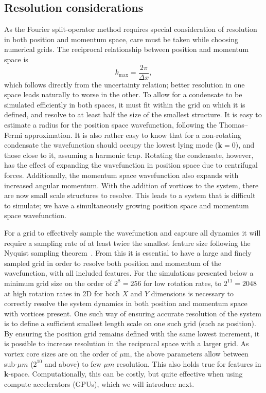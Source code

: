 \subsection{Resolution considerations}
As the Fourier split-operator method requires special consideration of resolution in both position and momentum space, care must be taken while choosing numerical grids. The reciprocal relationship between position and momentum space is \begin{equation}
    k_{\text{max}} = \frac{2\pi}{\Delta x},
\end{equation}
which follows directly from the uncertainty relation; better resolution in one space leads naturally to worse in the other. To allow for a condensate to be simulated efficiently in both spaces, it must fit within the grid on which it is defined, and resolve to at least half the size of the smallest structure. It is easy to estimate a radius for the position space wavefunction, following the Thomas--Fermi approximation. It is also rather easy to know that for a non-rotating condensate the wavefunction should occupy the lowest lying mode ($\mathbf{k}=0$), and those close to it, assuming a harmonic trap. Rotating the condensate, however, has the effect of expanding the wavefunction in position space due to centrifugal forces. Additionally, the momentum space wavefunction also expands with increased angular momentum. With the addition of vortices to the system, there are now small scale structures to resolve. This leads to a system that is difficult to simulate; we have a simultaneously growing position space and momentum space wavefunction.

For a grid to effectively sample the wavefunction and capture all dynamics it will require a sampling rate of at least twice the smallest feature size following the Nyquist sampling theorem~\cite{BK:NumRecipes}. From this it is essential to have a large and finely sampled grid in order to resolve both position and momentum of the wavefunction, with all included features. For the simulations presented below a minimum grid size on the order of $2^8 = 256$ for low rotation rates, to $2^{11} = 2048$ at high rotation rates in 2D for both $X$ and $Y$ dimensions is necessary to correctly resolve the system dynamics in both position and momentum space with vortices present. One such way of ensuring accurate resolution of the system is to define a sufficient smallest length scale on one such grid (such as position). By ensuring the position grid remains defined with the same lowest increment, it is possible to increase resolution in the reciprocal space with a larger grid. As vortex core sizes are on the order of $\mu$m, the above parameters allow between sub-$\mu m$ ($2^{10}$ and above) to few $\mu m$ resolution. This also holds true for features in $\mathbf{k}$-space. Computationally, this can be costly, but quite effective when using compute accelerators (GPUs), which we will introduce next. %
